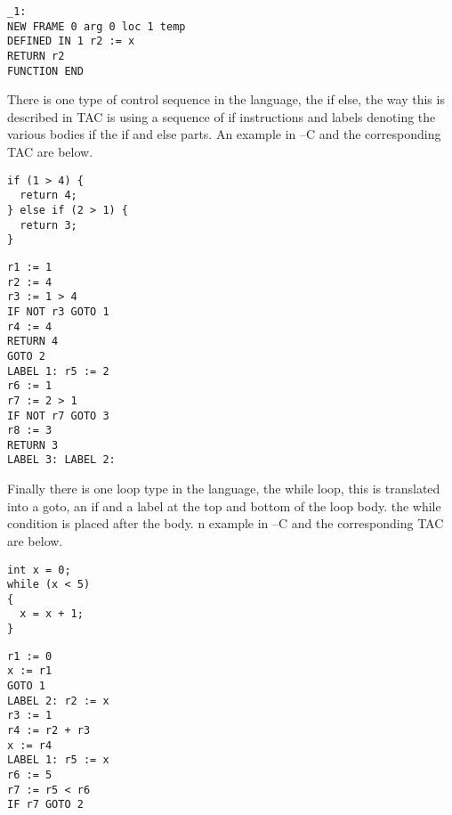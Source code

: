 \documentclass{article}
\begin{document}
\begin{lstlisting}
_1:
NEW FRAME 0 arg 0 loc 1 temp
DEFINED IN 1 r2 := x
RETURN r2
FUNCTION END
\end{lstlisting}

There is one type of control sequence in the language, the if else, the way this
is described in TAC is using a sequence of if instructions and labels denoting the
various bodies if the if and else parts. An example in --C and the corresponding TAC
are below.

\begin{lstlisting}
if (1 > 4) {
  return 4;
} else if (2 > 1) {
  return 3;
}
\end{lstlisting}

\begin{lstlisting}
r1 := 1
r2 := 4
r3 := 1 > 4
IF NOT r3 GOTO 1
r4 := 4
RETURN 4
GOTO 2
LABEL 1: r5 := 2
r6 := 1
r7 := 2 > 1
IF NOT r7 GOTO 3
r8 := 3
RETURN 3
LABEL 3: LABEL 2:
\end{lstlisting}

Finally there is one loop type in the language, the while loop, this is translated
into a goto, an if and a label at the top and bottom of the loop body. the while
condition is placed after the body. n example in --C and the corresponding TAC
are below.

\begin{lstlisting}
int x = 0;
while (x < 5)
{
  x = x + 1;
}
\end{lstlisting}

\begin{lstlisting}
r1 := 0
x := r1
GOTO 1
LABEL 2: r2 := x
r3 := 1
r4 := r2 + r3
x := r4
LABEL 1: r5 := x
r6 := 5
r7 := r5 < r6
IF r7 GOTO 2
\end{lstlisting}
\end{document}
